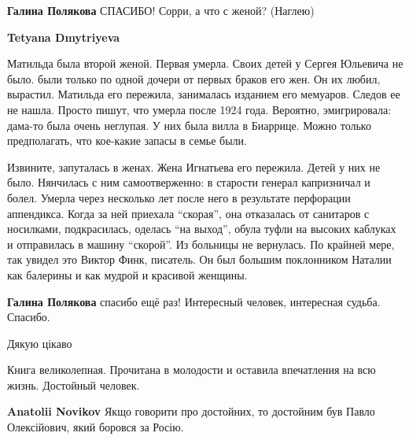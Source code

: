 \begin{itemize}
\begin{itemize}
\textbf{Галина Полякова} СПАСИБО! Сорри, а что с женой? (Наглею)

\textbf{Tetyana Dmytriyeva} 

Матильда была второй женой. Первая умерла. Своих детей у Сергея Юльевича не
было. были только по одной дочери от первых браков его жен. Он их любил,
вырастил. Матильда его пережила, занималась изданием его мемуаров. Следов ее не
нашла. Просто пишут, что умерла после 1924 года. Вероятно, эмигрировала:
дама-то была очень неглупая. У них была вилла в Биаррице. Можно только
предполагать, что кое-какие запасы в семье были.


Извините, запуталась в женах. Жена Игнатьева его пережила. Детей у них не было.
Нянчилась с ним самоотверженно: в старости генерал капризничал и болел. Умерла
через несколько лет после него в результате перфорации аппендикса. Когда за ней
приехала \enquote{скорая}, она отказалась от санитаров с носилками, подкрасилась,
оделась \enquote{на выход}, обула туфли на высоких каблуках и отправилась в машину
\enquote{скорой}. Из больницы не вернулась. По крайней мере, так увидел это Виктор
Финк, писатель. Он был большим поклонником Наталии как балерины и как мудрой и
красивой женщины.

\textbf{Галина Полякова} спасибо ещё раз! Интересный человек, интересная судьба. Спасибо.
\end{itemize} %

Дякую цікаво


Книга великолепная. Прочитана в молодости и оставила впечатления на всю жизнь. Достойный человек.

\begin{itemize} %
\textbf{Anatolii Novikov} Якщо говорити про достойних, то достойним був Павло Олексійович, який боровся за Росію.
\end{itemize} %

\end{itemize} %
